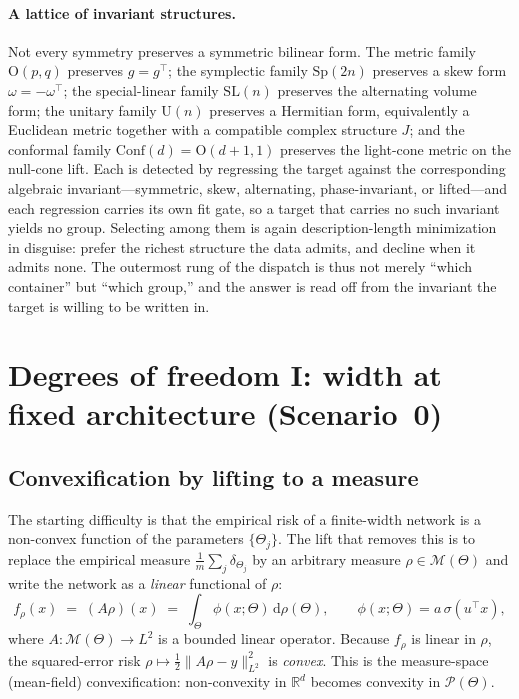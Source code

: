 \documentclass[11pt]{article}
\theoremstyle{definition}
\newcommand{\R}{\mathbb{R}}
\newcommand{\M}{\mathcal{M}}
\newcommand{\Pcal}{\mathcal{P}}
\newcommand{\dd}{\mathrm{d}}
\newcommand{\half}{\tfrac{1}{2}}
\begin{document}
\paragraph{A lattice of invariant structures.} Not every symmetry preserves a symmetric bilinear form.
The metric family $\mathrm{O}(p,q)$ preserves $g=g^{\!\top}$; the symplectic family $\mathrm{Sp}(2n)$
preserves a skew form $\omega=-\omega^{\!\top}$; the special-linear family $\mathrm{SL}(n)$ preserves
the alternating volume form; the unitary family $\mathrm{U}(n)$ preserves a Hermitian form, equivalently
a Euclidean metric together with a compatible complex structure $J$; and the conformal family
$\mathrm{Conf}(d)=\mathrm{O}(d+1,1)$ preserves the light-cone metric on the null-cone lift. Each is
detected by regressing the target against the corresponding algebraic invariant---symmetric, skew,
alternating, phase-invariant, or lifted---and each regression carries its own fit gate, so a target
that carries no such invariant yields no group. Selecting among them is again description-length
minimization in disguise: prefer the richest structure the data admits, and decline when it admits
none. The outermost rung of the dispatch is thus not merely ``which container'' but ``which group,''
and the answer is read off from the invariant the target is willing to be written in.



\section{Degrees of freedom I: width at fixed architecture (Scenario~0)}
\label{sec:scenario0}

\subsection{Convexification by lifting to a measure}
\label{sec:lift}

The starting difficulty is that the empirical risk of a finite-width network is a
non-convex function of the parameters $\{\Theta_j\}$. The lift that removes this is to
replace the empirical measure $\frac1m\sum_j\delta_{\Theta_j}$ by an arbitrary measure
$\rho\in\M(\Theta)$ and write the network as a \emph{linear} functional of $\rho$:
\begin{equation}
f_\rho(x) \;=\; (A\rho)(x) \;=\; \int_\Theta \phi(x;\Theta)\,\dd\rho(\Theta),
\qquad \phi(x;\Theta)=a\,\sigma(u^\top x),
\label{eq:forward-linear}
\end{equation}
where $A:\M(\Theta)\to L^2$ is a bounded linear operator. Because $f_\rho$ is linear in
$\rho$, the squared-error risk $\rho\mapsto \half\|A\rho-y\|_{L^2}^2$ is \emph{convex}. This is
the measure-space (mean-field) convexification: non-convexity in $\R^{d}$ becomes convexity
in $\Pcal(\Theta)$.
\end{document}
